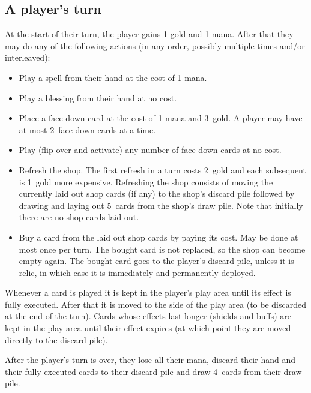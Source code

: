 \documentclass[dvipsnames,parskip,a4paper]{scrartcl}
\newcommand{\facedowncost}{3}
\newcommand{\refreshcost}{2}
\newcommand{\refreshcostincrease}{1}
\newcommand{\handsize}{4}
\newcommand{\dacedownsize}{2}
\newcommand{\shopsize}{5}
\begin{document}
\subsection*{A player's turn}

At the start of their turn, the player gains 1 gold and 1 mana. After that they may do any of the following actions (in any order, possibly multiple times and/or interleaved):

\begin{itemize}
\item Play a spell from their hand at the cost of 1 mana.
\item Play a blessing from their hand at no cost.
\item Place a face down card at the cost of 1 mana and \facedowncost \ gold. A player may have at most \dacedownsize \ face down cards at a time.
\item Play (flip over and activate) any number of face down cards at no cost.
\item Refresh the shop. The first refresh in a turn costs \refreshcost \ gold and each subsequent is \refreshcostincrease \ gold more expensive.
Refreshing the shop consists of moving the currently laid out shop cards (if any) to the shop's discard pile followed by drawing and laying out \shopsize \ cards from the shop's draw pile. Note that initially there are no shop cards laid out.
\item Buy a card from the laid out shop cards by paying its cost. May be done at most once per turn.
The bought card is not replaced, so the shop can become empty again. The bought card goes to the player's discard pile, unless it is relic, in which case it is immediately and permanently deployed.
\end{itemize}

Whenever a card is played it is kept in the player's play area until its effect is fully executed. After that it is moved to the side of the play area (to be discarded at the end of the turn). Cards whose effects last longer (shields and buffs) are kept in the play area until their effect expires (at which point they are moved directly to the discard pile).

\vspace{4pt}

After the player's turn is over, they lose all their mana, discard their hand and their fully executed cards to their discard pile and draw \handsize \ cards from their draw pile.

\newpage
\end{document}
